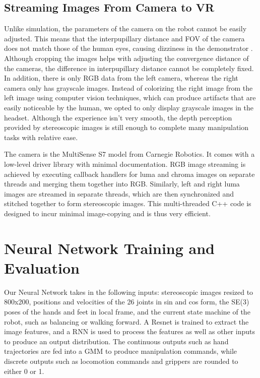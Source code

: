 \subsection{Streaming Images From Camera to VR}

Unlike simulation, the parameters of the camera on the robot cannot be easily adjusted. This means that the interpupillary distance and FOV of the camera does not match those of the human eyes, causing dizziness in the demonstrator \cite{distortion}. Although cropping the images helps with adjusting the convergence distance of the cameras, the difference in interpupillary distance cannot be completely fixed. In addition, there is only RGB data from the left camera, whereas the right camera only has grayscale images. Instead of colorizing the right image from the left image using computer vision techniques, which can produce artifacts that are easily noticeable by the human, we opted to only display grayscale images in the headset. Although the experience isn't very smooth, the depth perception provided by stereoscopic images is still enough to complete many manipulation tasks with relative ease. 

The camera is the MultiSense S7 model from Carnegie Robotics. It comes with a low-level driver library with minimal documentation. RGB image streaming is achieved by executing callback handlers for luma and chroma images on separate threads and merging them together into RGB. Similarly, left and right luma images are streamed in separate threads, which are then synchronized and stitched together to form stereoscopic images. This multi-threaded C++ code is designed to incur minimal image-copying and is thus very efficient.

\section{Neural Network Training and Evaluation}

Our Neural Network takes in the following inputs: stereoscopic images resized to 800x200, positions and velocities of the 26 joints in sin and cos form, the SE(3) poses of the hands and feet in local frame, and the current state machine of the robot, such as balancing or walking forward. A Resnet is trained to extract the image features, and a RNN is used to process the features as well as other inputs to produce an output distribution. The continuous outputs such as hand trajectories are fed into a GMM to produce manipulation commands, while discrete outputs such as locomotion commands and grippers are rounded to either 0 or 1. 

